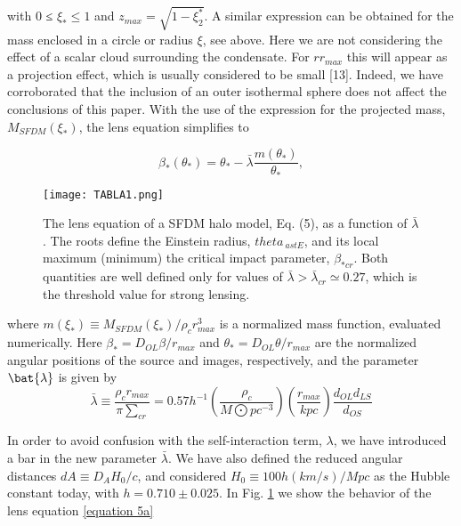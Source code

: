 \documentclass[%
 twocolumn,
 amsmath,amssymb,
 aps,
]{revtex4-2}
\begin{document}
with 0 ≤ $\xi_{\ast} ≤ 1$ and $z_{max} =\sqrt{1 − \xi_{2}^{\ast}}$. A similar
expression can be obtained for the mass enclosed in a
circle or radius $\xi$, see  above. Here we are not
considering the effect of a scalar cloud surrounding the
condensate. For $r  r_{max}$ this will appear as a projection
effect, which is usually considered to be small [13]. Indeed, we have corroborated that the inclusion of an outer
isothermal sphere does not affect the conclusions of this
paper.
With the use of the expression for the projected mass,
$M_{SFDM}(\xi_{\ast})$, the lens equation simplifies to
\begin{subequation}

\begin{equation}
    \beta_{\ast}(\theta_{\ast})=\theta_{\ast}- \bar{\lambda}\frac{m(\theta_{\ast})}{\theta_{\ast}} ,
    \label{equation 5a}
\end{equation}

\begin{figure}[h]
    \centering
    \texttt{[image: TABLA1.png]}
    \caption{The lens equation of a SFDM halo model, Eq. (5), as
a function of $\bar{\lambda}$. The roots define the Einstein radius, $theta_{\ ast E}$, and
its local maximum (minimum) the critical impact parameter,
$\beta_{\ast cr}$. Both quantities are well defined only for values of $\bar{\lambda} >\bar{\lambda}_{cr} \simeq 0.27$, which is the threshold value for strong lensing.}
    \label{figura 1}
\end{figure}
where $m(\xi_{\ast}) \equiv M_{SFDM}(\xi_{\ast})/\rho_{c}r^{3}_{ max}$ is a normalized mass function, evaluated numerically. Here $\beta_{\ast} =D_{OL}\beta/r_{max}$ and $\theta_{\ast} = D_{OL}\theta/r_{max}$ are the normalized angular positions of the source and images, respectively, and the parameter $\bat{\lambda}$ is given by
\begin{equation}
    \bar{\lambda}\equiv\frac{\rho_{c}r_{max}}{\pi \sum_{cr}}=0.57h^{-1}(\frac{\rho_{c}}{M\bigodot pc^{-3}})(\frac{r_{max}}{kpc})\frac{d_{OL}d_{LS}}{d_{OS}}
    \label{equation 5b}
\end{equation}

\end{subequation}
In order to avoid confusion with the self-interaction term,
$\lambda$, we have introduced a bar in the new parameter $\bar{\lambda}$. We
have also defined the reduced angular distances $dA \equiv D_{A}H_{0}/c$, and considered $H_{0} \equiv 100h(km/s)/Mpc$ as the
Hubble constant today, with $h = 0.710 \pm 0.025$.
In Fig. \ref{figura 1} we show the behavior of the lens equation \ref{equation 5a}
\end{document}
